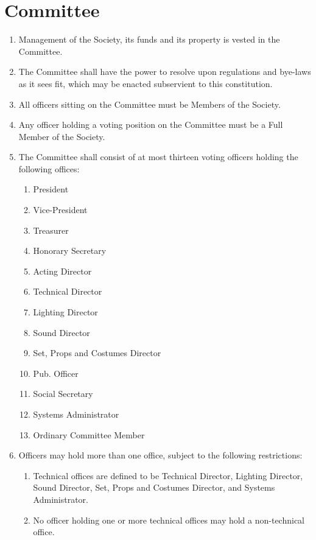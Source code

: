 \documentclass[a4paper]{tufte-handout}
\newcommand{\policyOffset}{12pt}
\newcommand{\policyCspp}[2][\policyOffset]{\marginnote[#1]{\textsc{CSP Policy \S#2}}}
\begin{document}
\section{Committee}
\begin{enumerate}[resume]
    \item Management of the Society, its funds and its property is vested in the Committee.
    \item The Committee shall have the power to resolve upon regulations and bye-laws as it sees fit, which may be enacted subservient to this constitution.
    \item All officers sitting on the Committee must be Members of the Society.
    \item \policyCspp{66} Any officer holding a voting position on the Committee must be a Full Member of the Society.
    \item \policyCspp{65} The Committee shall consist of at most thirteen voting officers holding the following offices:
        \begin{enumerate}
            \item President
            \item Vice-President
            \item Treasurer
            \item Honorary Secretary
            \item Acting Director
            \item Technical Director
            \item Lighting Director
            \item Sound Director
            \item Set, Props and Costumes Director
            \item Pub. Officer
            \item Social Secretary
            \item Systems Administrator
            \item Ordinary Committee Member
        \end{enumerate}
    \item Officers may hold more than one office, subject to the following restrictions:
    	\begin{enumerate}
            \item Technical offices are defined to be Technical Director, Lighting Director, Sound Director, Set, Props and Costumes Director, and Systems Administrator.
            \item No officer holding one or more technical offices may hold a non-technical office.

\end{enumerate}
\end{enumerate}
\end{document}
